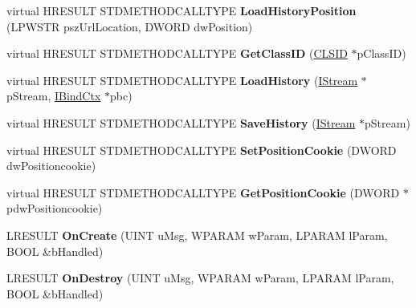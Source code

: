 \begin{DoxyCompactItemize}
virtual H\+R\+E\+S\+U\+LT S\+T\+D\+M\+E\+T\+H\+O\+D\+C\+A\+L\+L\+T\+Y\+PE {\bfseries Load\+History\+Position} (L\+P\+W\+S\+TR psz\+Url\+Location, D\+W\+O\+RD dw\+Position)
\item 
\mbox{\label{class_c_shell_browser_a624d2f0503cbc04ad6ea20a5b360ef7a}} 
virtual H\+R\+E\+S\+U\+LT S\+T\+D\+M\+E\+T\+H\+O\+D\+C\+A\+L\+L\+T\+Y\+PE {\bfseries Get\+Class\+ID} (\hyperlink{struct___i_i_d}{C\+L\+S\+ID} $\ast$p\+Class\+ID)
\item 
\mbox{\label{class_c_shell_browser_a9a4de0af03e8b083bf78c1d6b7012c8e}} 
virtual H\+R\+E\+S\+U\+LT S\+T\+D\+M\+E\+T\+H\+O\+D\+C\+A\+L\+L\+T\+Y\+PE {\bfseries Load\+History} (\hyperlink{interface_i_stream}{I\+Stream} $\ast$p\+Stream, \hyperlink{interface_i_bind_ctx}{I\+Bind\+Ctx} $\ast$pbc)
\item 
\mbox{\label{class_c_shell_browser_a30868e9607051d38e756b57215b684de}} 
virtual H\+R\+E\+S\+U\+LT S\+T\+D\+M\+E\+T\+H\+O\+D\+C\+A\+L\+L\+T\+Y\+PE {\bfseries Save\+History} (\hyperlink{interface_i_stream}{I\+Stream} $\ast$p\+Stream)
\item 
\mbox{\label{class_c_shell_browser_af6c3eda438251516ac62218e6bfd8079}} 
virtual H\+R\+E\+S\+U\+LT S\+T\+D\+M\+E\+T\+H\+O\+D\+C\+A\+L\+L\+T\+Y\+PE {\bfseries Set\+Position\+Cookie} (D\+W\+O\+RD dw\+Positioncookie)
\item 
\mbox{\label{class_c_shell_browser_ae83c7c53518387243315f5d5d52082d9}} 
virtual H\+R\+E\+S\+U\+LT S\+T\+D\+M\+E\+T\+H\+O\+D\+C\+A\+L\+L\+T\+Y\+PE {\bfseries Get\+Position\+Cookie} (D\+W\+O\+RD $\ast$pdw\+Positioncookie)
\item 
\mbox{\label{class_c_shell_browser_a6985cde94e4de603873e786343a1bf5b}} 
L\+R\+E\+S\+U\+LT {\bfseries On\+Create} (U\+I\+NT u\+Msg, W\+P\+A\+R\+AM w\+Param, L\+P\+A\+R\+AM l\+Param, B\+O\+OL \&b\+Handled)
\item 
\mbox{\label{class_c_shell_browser_a34dd56eba86d864cff822dd2a1df931f}} 
L\+R\+E\+S\+U\+LT {\bfseries On\+Destroy} (U\+I\+NT u\+Msg, W\+P\+A\+R\+AM w\+Param, L\+P\+A\+R\+AM l\+Param, B\+O\+OL \&b\+Handled)
\item 

\end{DoxyCompactItemize}
